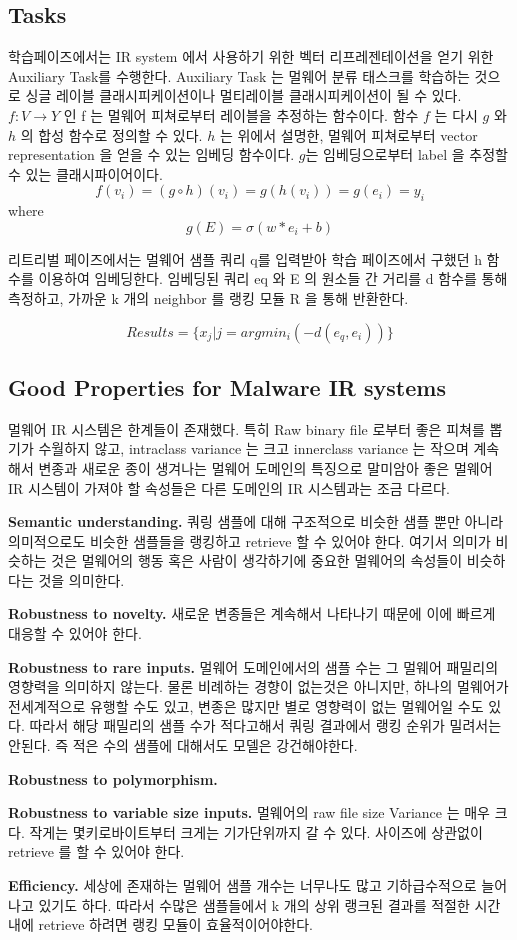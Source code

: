 \subsection{Tasks}

학습페이즈에서는 IR system 에서 사용하기 위한 벡터 리프레젠테이션을 얻기 위한 Auxiliary Task를 수행한다. Auxiliary Task 는 멀웨어 분류 태스크를 학습하는 것으로 싱글 레이블 클래시피케이션이나 멀티레이블 클래시피케이션이 될 수 있다. $f: V \rightarrow Y $ 인 f 는 멀웨어 피쳐로부터 레이블을 추정하는 함수이다. 함수 $f$ 는 다시 $g$ 와 $h$ 의 합성 함수로 정의할 수 있다. $h$ 는 위에서 설명한, 멀웨어 피쳐로부터 vector representation 을 얻을 수 있는 임베딩 함수이다. $g$는 임베딩으로부터 label 을 추정할 수 있는 클래시파이어이다.  
\[
f(v_i) = (g \circ h)(v_i) = g(h(v_i)) = g(e_i) = y_i 
\]
where
\[
g(E) = \sigma (w*e_i + b) 
\]

리트리벌 페이즈에서는 멀웨어 샘플 쿼리 q를 입력받아 학습 페이즈에서 구했던 h 함수를 이용하여 임베딩한다. 임베딩된 쿼리 eq 와 E 의 원소들 간 거리를 d 함수를 통해 측정하고, 가까운 k 개의 neighbor 를 랭킹 모듈 R 을 통해 반환한다. 

\[
Results = \{x_j | j = argmin_i( {-d(e_q, e_i)} )  \}
\]

\subsection{Good Properties for Malware IR systems}
멀웨어 IR 시스템은 한계들이 존재했다. 특히 Raw binary file 로부터 좋은 피쳐를 뽑기가 수월하지 않고, intraclass variance 는 크고 innerclass variance 는 작으며 계속해서 변종과 새로운 종이 생겨나는 멀웨어 도메인의 특징으로 말미암아 좋은 멀웨어 IR 시스템이 가져야 할 속성들은 다른 도메인의 IR 시스템과는 조금 다르다.

\textbf{Semantic understanding. }
쿼링 샘플에 대해 구조적으로 비슷한 샘플 뿐만 아니라 의미적으로도 비슷한 샘플들을 랭킹하고 retrieve 할 수 있어야 한다. 여기서 의미가 비슷하는 것은 멀웨어의 행동 혹은 사람이 생각하기에 중요한 멀웨어의 속성들이 비슷하다는 것을 의미한다. 


\textbf{Robustness to novelty. }
새로운 변종들은 계속해서 나타나기 때문에 이에 빠르게 대응할 수 있어야 한다. 


\textbf{Robustness to rare inputs. }
멀웨어 도메인에서의 샘플 수는 그 멀웨어 패밀리의 영향력을 의미하지 않는다. 물론 비례하는 경향이 없는것은 아니지만, 하나의 멀웨어가 전세계적으로 유행할 수도 있고, 변종은 많지만 별로 영향력이 없는 멀웨어일 수도 있다. 따라서 해당 패밀리의 샘플 수가 적다고해서 쿼링 결과에서 랭킹 순위가 밀려서는 안된다. 즉 적은 수의 샘플에 대해서도 모델은 강건해야한다. 


\textbf{Robustness to polymorphism. }


\textbf{Robustness to variable size inputs. }
멀웨어의 raw file size Variance 는 매우 크다. 작게는 몇키로바이트부터 크게는 기가단위까지 갈 수 있다. 사이즈에 상관없이 retrieve 를 할 수 있어야 한다.

\textbf{Efficiency. }
세상에 존재하는 멀웨어 샘플 개수는 너무나도 많고 기하급수적으로 늘어나고 있기도 하다. 따라서 수많은 샘플들에서 k 개의 상위 랭크된 결과를 적절한 시간 내에 retrieve 하려면 랭킹 모듈이 효율적이어야한다.

